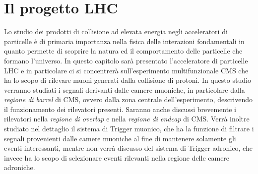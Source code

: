 \chapter{Il progetto LHC}
\label{cap:PrimoCapitolo}
\let\cleardoublepage\clearpage

\sloppy

Lo studio dei prodotti di collisione ad elevata energia negli acceleratori di particelle è di primaria importanza nella fisica delle interazioni fondamentali in quanto permette di scoprire la natura ed il comportamento delle particelle che formano l'universo. In questo capitolo sarà presentato l'acceleratore di particelle LHC e in particolare ci si concentrerà sull'esperimento multifunzionale CMS che ha lo scopo di rilevare muoni generati dalla collisione di protoni. In questo studio verranno studiati i segnali derivanti dalle camere muoniche, in particolare dalla \textit{regione di barrel} di CMS, ovvero dalla zona centrale dell'esperimento, descrivendo il funzionamento dei rilevatori presenti. Saranno anche discussi brevemente i rilevatori nella \textit{regione di overlap} e nella \textit{regione di endcap} di CMS. \newline
Verrà inoltre studiato nel dettaglio il sistema di Trigger muonico, che ha la funzione di filtrare i segnali provenienti dalle camere muoniche al fine di mantenere solamente gli eventi interessanti, mentre non verrà discusso del sistema di Trigger adronico, che invece ha lo scopo di selezionare eventi rilevanti nella regione delle camere adroniche.

